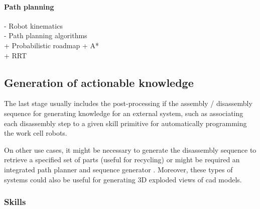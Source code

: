 \paragraph{Path planning}

- Robot kinematics\\
- Path planning algorithms\\
	+ Probabilistic roadmap
	+ A*\\
	+ RRT\\





\subsection{Generation of actionable knowledge}

The last stage usually includes the post-processing if the assembly / disassembly sequence for generating knowledge for an external system, such as associating each disassembly step to a given skill primitive \cite{Thomas2003} for automatically programming the work cell robots.

On other use cases, it might be necessary to generate the disassembly sequence to retrieve a specified set of parts \cite{Smith2012} (useful for recycling) or might be required an integrated path planner and sequence generator \cite{Le2009}. Moreover, these types of systems could also be useful for generating 3D exploded views \cite{Li2008} of \gls{cad} models.



\subsubsection{Skills}

